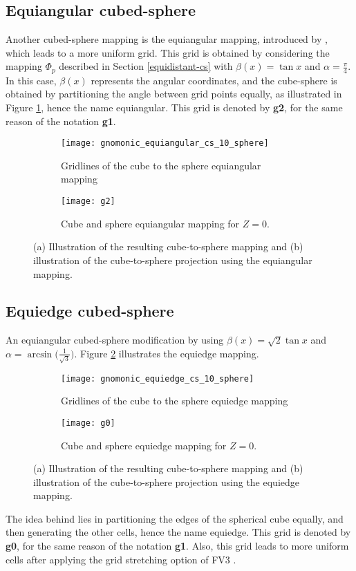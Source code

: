 \subsection{Equiangular cubed-sphere}
\label{cs-equiangular}
Another cubed-sphere mapping is the equiangular mapping, 
introduced by \citet{ronchi:1996}, which leads to a more uniform grid.
This grid is obtained by considering the mapping $\Phi_p$ described in Section \ref{equidistant-cs}
with $\beta(x) = \tan{x}$ and $\alpha=\frac{\pi}{4}$.
In this case, $\beta(x)$ represents the angular coordinates, and the cube-sphere is obtained by partitioning the angle between
grid points equally, as illustrated in Figure \ref{chp-cs-equiangular}, hence the name equiangular.
This grid is denoted by \textbf{g2}, for the same reason of the notation \textbf{g1}.
\begin{figure}[!htb]
	\centering
	\begin{subfigure}{0.42\textwidth}
		\texttt{[image: gnomonic\_equiangular\_cs\_10\_sphere]}
		\caption{Gridlines of the cube to the sphere equiangular mapping}
	\end{subfigure}
	\begin{subfigure}{0.42\textwidth}
		\centering
		\texttt{[image: g2]}
		\caption{Cube and sphere equiangular mapping for $Z=0$.}
	\end{subfigure}
	\caption{(a) Illustration of the resulting cube-to-sphere mapping and (b) illustration of the cube-to-sphere projection using the equiangular mapping.\label{chp-cs-equiangular}}
\end{figure}

\subsection{Equiedge cubed-sphere}
\label{cs-equiedge}
An equiangular cubed-sphere modification 
\citet{chen:2021} by using $\beta(x) = \sqrt{2}\tan{x}$ and
$\alpha=\arcsin{\big(\frac{1}{\sqrt{3}}\big)}$.
Figure \ref{chp-cs-equiedge} illustrates the equiedge mapping.
\begin{figure}[!htb]
	\centering
	\begin{subfigure}{0.42\textwidth}
		\texttt{[image: gnomonic\_equiedge\_cs\_10\_sphere]}
		\caption{Gridlines of the cube to the sphere equiedge mapping}
	\end{subfigure}
	\begin{subfigure}{0.42\textwidth}
		\centering
		\texttt{[image: g0]}
		\caption{Cube and sphere equiedge mapping for $Z=0$.}
	\end{subfigure}
	\caption{(a) Illustration of the resulting cube-to-sphere mapping and (b) illustration of the cube-to-sphere projection using the equiedge mapping.\label{chp-cs-equiedge}}
\end{figure}
The idea behind lies in partitioning the edges of the spherical cube equally, and then generating the other cells,
hence the name equiedge.
This grid is denoted by \textbf{g0}, for the same reason of the notation \textbf{g1}.
Also, this grid leads to more uniform cells after applying the grid stretching option of FV3 \citep{harris:2016, chen:2021}.

